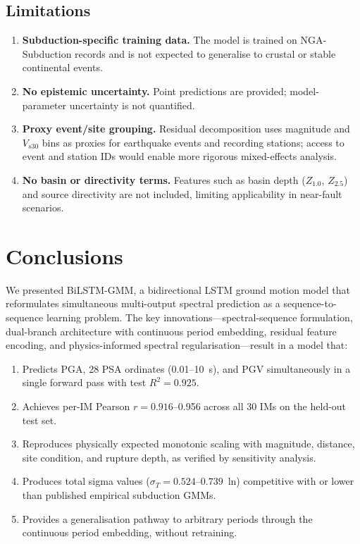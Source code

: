 \documentclass[12pt,a4paper]{article}
\begin{document}
\subsection{Limitations}

\begin{enumerate}[leftmargin=*,label=\textbf{L\arabic*.}]
  \item \textbf{Subduction-specific training data.}
    The model is trained on NGA-Subduction records and is not expected to
    generalise to crustal or stable continental events.
  \item \textbf{No epistemic uncertainty.}
    Point predictions are provided; model-parameter uncertainty is not quantified.
  \item \textbf{Proxy event/site grouping.}
    Residual decomposition uses magnitude and $V_{s30}$ bins as proxies for
    earthquake events and recording stations; access to event and station IDs
    would enable more rigorous mixed-effects analysis.
  \item \textbf{No basin or directivity terms.}
    Features such as basin depth ($Z_{1.0}$, $Z_{2.5}$) and source directivity
    are not included, limiting applicability in near-fault scenarios.
\end{enumerate}

\section{Conclusions}
\label{sec:conclusion}

We presented BiLSTM-GMM, a bidirectional LSTM ground motion model that
reformulates simultaneous multi-output spectral prediction as a
sequence-to-sequence learning problem.
The key innovations---spectral-sequence formulation, dual-branch architecture
with continuous period embedding, residual feature encoding, and
physics-informed spectral regularisation---result in a model that:
\begin{enumerate}[leftmargin=*]
  \item Predicts PGA, 28 PSA ordinates (0.01--10~s), and PGV simultaneously in
        a single forward pass with test $R^2 = 0.925$.
  \item Achieves per-IM Pearson $r = 0.916$--0.956 across all 30 IMs on the
        held-out test set.
  \item Reproduces physically expected monotonic scaling with magnitude,
        distance, site condition, and rupture depth, as verified by sensitivity
        analysis.
  \item Produces total sigma values ($\sigma_T = 0.524$--$0.739$~ln) competitive
        with or lower than published empirical subduction GMMs.
  \item Provides a generalisation pathway to arbitrary periods through the
        continuous period embedding, without retraining.
\end{enumerate}
\end{document}
